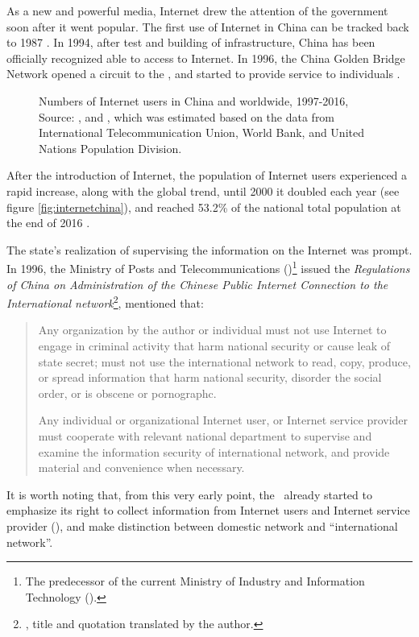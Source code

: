 As a new and powerful media, Internet drew the attention of the government soon after it went popular. The first use of Internet in China can be tracked back to 1987 \citep{wang_first_1987,shrum_origin_2007}. In 1994, after test and building of infrastructure, China has been officially recognized able to access to Internet. In 1996, the China Golden Bridge Network opened a circuit to the , and started to provide service to individuals \citep{cernic_evolution_2001}.
\begin{figure*}[!htbp]
	\centering
	
	\caption[Numbers of Internet users in China, 1997-2016]{Numbers of Internet users in China and worldwide, 1997-2016, Source: \citet{cnnic__2016}, and \citet{internet_live_stats_internet_2016}, which was estimated based on the data from International Telecommunication Union, World Bank, and United Nations Population Division.}
	\label{fig:internetchina}
\end{figure*}
After the introduction of Internet, the population of Internet users experienced a rapid increase, along with the global trend, until 2000 it doubled each year (see figure \vref{fig:internetchina}), and reached 53.2\% of the national total population at the end of 2016 \citep{cnnic__2016}.

The state's realization of supervising the information on the Internet was prompt. In 1996, the Ministry of Posts and Telecommunications (\mpt)\footnote{The predecessor of the current Ministry of Industry and Information Technology (\miit).} issued the \textit{Regulations of China on Administration of the Chinese Public Internet Connection to the International network}\footnote{\citet{__1996}, title and quotation translated by the author.}, mentioned that:
\begin{quote}
	\begin{description}[font=\rm]
		\item[\smallcaps{article 10}] Any organization by the author or individual must not use Internet to engage in criminal activity that harm national security or cause leak of state secret; must not use the international network to read, copy, produce, or spread information that harm national security, disorder the social order, or is obscene or pornographc.
		\item[\smallcaps{article 12}] Any individual or organizational Internet user, or Internet service provider must cooperate with relevant national department to supervise and examine the information security of international network, and provide material and convenience when necessary.
	\end{description}
\end{quote}
It is worth noting that, from this very early point, the \mpt\ already started to emphasize its right to collect information from Internet users and Internet service provider (\isp), and make distinction between domestic network and ``international network''.

